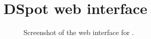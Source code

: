 \chapter{DSpot web interface}

\begin{figure}
	\centering
	\caption{Screenshot of the web interface for \dspot.}
	\label{fig:dspot-web}
\end{figure}
